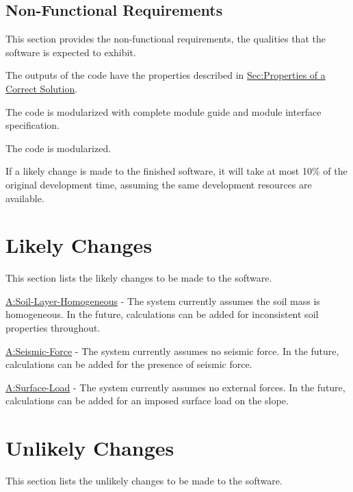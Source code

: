 \documentclass[12pt]{article}
\begin{document}
\subsection{Non-Functional Requirements}
\label{Sec:NFRs}
This section provides the non-functional requirements, the qualities that the software is expected to exhibit.

\begin{description}[font=\normalfont]
\item[Correct:\phantomsection\label{correct}]{The outputs of the code have the properties described in \hyperref[Sec:CorSolProps]{Sec:Properties of a Correct Solution}.}
\item[Understandable:\phantomsection\label{understandable}]{The code is modularized with complete module guide and module interface specification.}
\item[Reusable:\phantomsection\label{reusable}]{The code is modularized.}
\item[Maintainable:\phantomsection\label{maintainable}]{If a likely change is made to the finished software, it will take at most 10$\%$ of the original development time, assuming the same development resources are available.}
\end{description}
\section{Likely Changes}
\label{Sec:LCs}
This section lists the likely changes to be made to the software.

\begin{description}[font=\normalfont]
\item[Calculate-Inhomogeneous-Soil-Layers:\phantomsection\label{LC_inhomogeneous}]{\hyperref[assumpSLH]{A:Soil-Layer-Homogeneous} - The system currently assumes the soil mass is homogeneous. In the future, calculations can be added for inconsistent soil properties throughout.}
\item[Calculate-Seismic-Force:\phantomsection\label{LC_seismic}]{\hyperref[assumpSF]{A:Seismic-Force} - The system currently assumes no seismic force. In the future, calculations can be added for the presence of seismic force.}
\item[Calculate-External-Force:\phantomsection\label{LC_external}]{\hyperref[assumpSL]{A:Surface-Load} - The system currently assumes no external forces. In the future, calculations can be added for an imposed surface load on the slope.}
\end{description}
\section{Unlikely Changes}
\label{Sec:UCs}
This section lists the unlikely changes to be made to the software.
\end{document}
